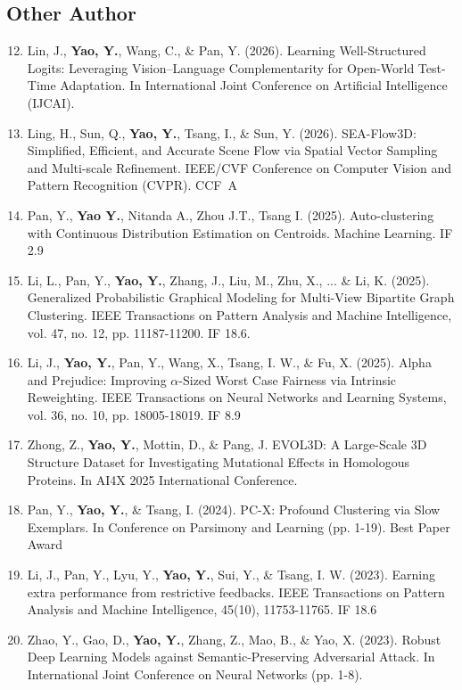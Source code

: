 \documentclass[10pt, letterpaper]{article}
\begin{document}
\subsection{Other Author}
\begin{enumerate}
\setcounter{enumi}{11}
    \item Lin, J., \textbf{Yao, Y.}, Wang, C., \& Pan, Y. (2026). Learning Well-Structured Logits: Leveraging Vision–Language Complementarity for Open-World Test-Time Adaptation. In International Joint Conference on Artificial Intelligence (IJCAI). 
    \item Ling, H., Sun, Q., \textbf{Yao, Y.}, Tsang, I., \& Sun, Y. (2026). SEA-Flow3D: Simplified, Efficient, and Accurate Scene Flow via Spatial Vector Sampling and Multi-scale Refinement. IEEE/CVF Conference on Computer Vision and Pattern Recognition (CVPR). {\color{deeppink}CCF~A}
    \item Pan, Y., \textbf{Yao Y.}, Nitanda A., Zhou J.T., Tsang I. (2025). Auto-clustering with Continuous Distribution Estimation on Centroids. Machine Learning. {\color{deeppink}IF 2.9}
    \item Li, L., Pan, Y., \textbf{Yao, Y.}, Zhang, J., Liu, M., Zhu, X., ... \& Li, K. (2025). Generalized Probabilistic Graphical Modeling for Multi-View Bipartite Graph Clustering. IEEE Transactions on Pattern Analysis and Machine Intelligence, vol. 47, no. 12, pp. 11187-11200. {\color{deeppink}IF 18.6.}
    \item Li, J., \textbf{Yao, Y.}, Pan, Y., Wang, X., Tsang, I. W., \& Fu, X. (2025). Alpha and Prejudice: Improving $\alpha$-Sized Worst Case Fairness via Intrinsic Reweighting. IEEE Transactions on Neural Networks and Learning Systems, vol. 36, no. 10, pp. 18005-18019. {\color{deeppink}IF 8.9}
    \item Zhong, Z., \textbf{Yao, Y.}, Mottin, D., \& Pang, J. EVOL3D: A Large-Scale 3D Structure Dataset for Investigating Mutational Effects in Homologous Proteins. In AI4X 2025 International Conference.
    \item Pan, Y., \textbf{Yao, Y.}, \& Tsang, I. (2024). PC-X: Profound Clustering via Slow Exemplars. In Conference on Parsimony and Learning (pp. 1-19). {\color{deeppink}Best Paper Award}
    \item Li, J., Pan, Y., Lyu, Y., \textbf{Yao, Y.}, Sui, Y., \& Tsang, I. W. (2023). Earning extra performance from restrictive feedbacks. IEEE Transactions on Pattern Analysis and Machine Intelligence, 45(10), 11753-11765. {\color{deeppink}IF 18.6}
    \item Zhao, Y., Gao, D., \textbf{Yao, Y.}, Zhang, Z., Mao, B., \& Yao, X. (2023). Robust Deep Learning Models against Semantic-Preserving Adversarial Attack. In International Joint Conference on Neural Networks (pp. 1-8).
\end{enumerate}            
\end{document}
